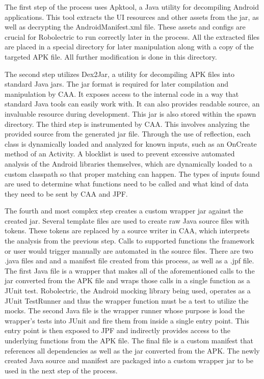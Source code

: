 \documentclass[conference]{IEEEtran}
\begin{document}
The first step of the process uses Apktool, a Java utility for decompiling Android applications. This tool extracts the UI resources and other assets from the jar, as well as decrypting the AndroidManifest.xml file.  These assets and configs are crucial for Robolectric to run correctly later in the process.  All the extracted files are placed in a special directory for later manipulation along with a copy of the targeted APK file.  All further modification is done in this directory.

The second step utilizes Dex2Jar, a utility for decompiling APK files into standard Java jars. The jar format is required for later compilation and manipulation by CAA. It exposes access to the internal code in a way that standard Java tools can easily work with.  It can also provides readable source, an invaluable resource during development.  This jar is also stored within the spawn directory.
The third step is instrumented by CAA.  This involves analyzing the provided source from the generated jar file. Through the use of reflection, each class is dynamically loaded and analyzed for known inputs, such as an OnCreate method of an Activity. A blocklist is used to prevent excessive automated analysis of the Android libraries themselves, which are dynamically loaded to a custom classpath so that proper matching can happen.  The types of inputs found are used to determine what functions need to be called and what kind of data they need to be sent by CAA and JPF.

The fourth and most complex step creates a custom wrapper jar against the created jar. Several template files are used to create raw Java source files with tokens.  These tokens are replaced by a source writer in CAA, which interprets the analysis from the previous step.  Calls to supported functions the framework or user would trigger manually are automated in the source files.  There are two .java files and and a manifest file created from this process, as well as a .jpf file. The first Java file is a wrapper that makes all of the aforementioned calls to the jar converted from the APK file and wraps those calls in a single function as a JUnit test. Robolectric, the Android mocking library being used, operates as a JUnit TestRunner and thus the wrapper function must be a test to utilize the mocks. The second Java file is the wrapper runner whose purpose is load the wrapper's tests into JUnit and fire them from inside a single entry point. This entry point is then exposed to JPF and indirectly provides access to the underlying functions from the APK file.  The final file is a custom manifest that references all dependencies as well as the jar converted from the APK.  The newly created Java source and manifest are packaged into a custom wrapper jar to be used in the next step of the process.
\end{document}
